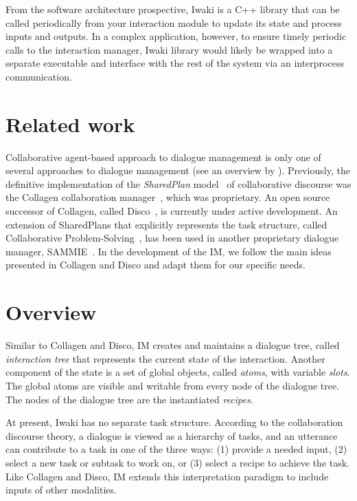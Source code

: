 From the software architecture prospective, Iwaki is a C++ library that can be called periodically from your interaction module to update its state and process inputs and outputs. In a complex application, however, to ensure timely periodic calls to the interaction manager, Iwaki library would likely be wrapped into a separate executable and interface with the rest of the system via an interprocess communication.

\section{Related work}

Collaborative agent-based approach to dialogue management is only one of several approaches to dialogue management (see an overview by \citet{Bui2006}). Previously, the definitive implementation of the \textsl{SharedPlan} model~\citep{GrozsSidner1990} of collaborative discourse was the Collagen collaboration manager~\citep{RichSidner1998}, which was proprietary. An open source successor of Collagen, called Disco~\citep{RichSidner2012}, is currently under active development. An extension of SharedPlans that explicitly represents the task structure, called Collaborative Problem-Solving~\citep{Blaylock2005}, has been used in another proprietary dialogue manager, SAMMIE~\citet{Becker2006}. In the development of the IM, we follow the main ideas presented in Collagen and Disco and adapt them for our specific needs.



\section{Overview}

Similar to Collagen and Disco, IM creates and maintains a dialogue tree, called \textsl{interaction tree} that represents the current state of the interaction. Another component of the state is a set of global objects, called \textsl{atoms}, with variable \textsl{slots}. The global atoms are visible and writable from every node of the dialogue tree. The nodes of the dialogue tree are the instantiated \textsl{recipes}.

At present, Iwaki has no separate task structure. According to the collaboration discourse theory, a dialogue is viewed as a hierarchy of tasks, and an utterance can contribute to a task in one of the three ways: (1) provide a needed input, (2) select a new task or subtask to work on, or (3) select a recipe to achieve the task. Like Collagen and Disco, IM extends this interpretation paradigm to include inputs of other modalities. 


